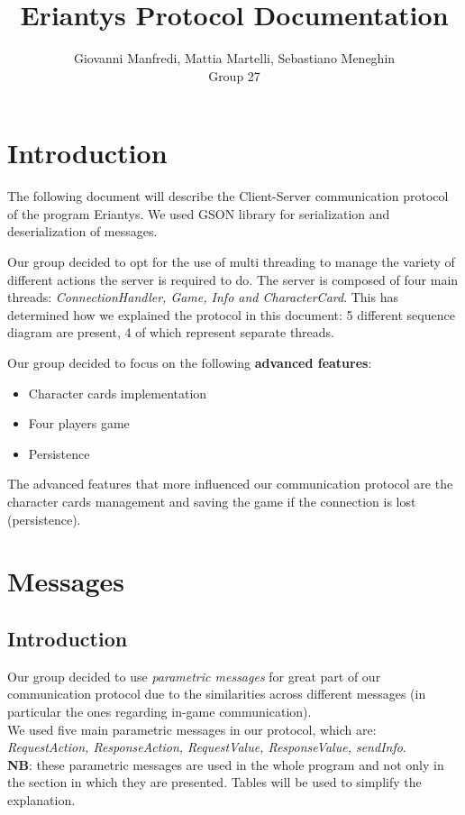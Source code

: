 \documentclass[12pt]{article}
\title{Eriantys Protocol Documentation}
\author{Giovanni Manfredi, Mattia Martelli, Sebastiano Meneghin\\Group 27}
\date{}
\begin{document}
	
	\maketitle
	
	\section*{Introduction}
	
	The following document will describe the Client-Server communication protocol of the program Eriantys. We used GSON library for serialization and deserialization of messages.
	
	Our group decided to opt for the use of multi threading to manage the variety of different actions the server is required to do. The server is composed of four main threads: \textit{ConnectionHandler, Game, Info and CharacterCard}. This has determined how we explained the protocol in this document: 5 different sequence diagram are present, 4 of which represent separate threads.
	
	Our group decided to focus on the following \textbf{advanced features}:
	\begin{itemize}
		\item Character cards implementation
		\item Four players game
		\item Persistence
	\end{itemize}
	The advanced features that more influenced our communication protocol are the character cards management and saving the game if the connection is lost (persistence). 
	
	\newpage
	
	\section{Messages}
	
		\subsection*{Introduction}
	
		Our group decided to use \emph{parametric messages} for great part of our communication protocol due to the similarities across different messages (in particular the ones regarding in-game communication). \\
		We used five main parametric messages in our protocol, which are: \emph{RequestAction, ResponseAction, RequestValue, ResponseValue, sendInfo}. \\
		\textbf{NB}: these parametric messages are used in the whole program and not only in the section in which they are presented. Tables will be used to simplify the explanation. 
	
\end{document}
